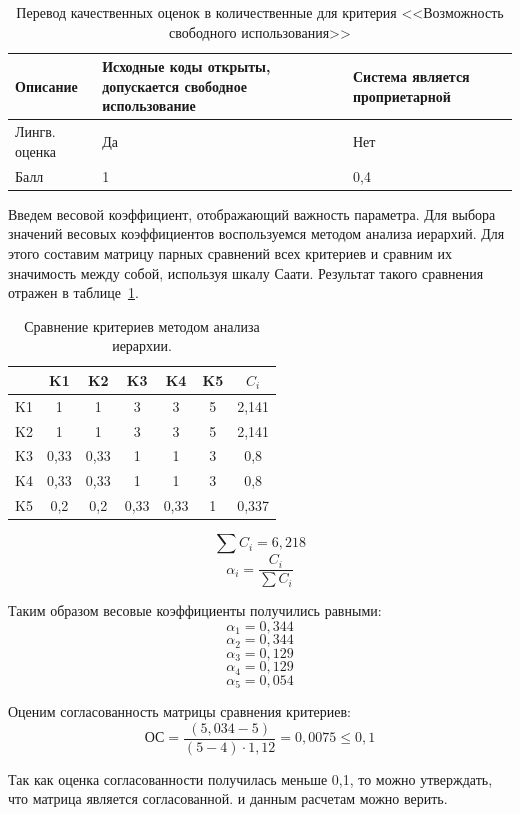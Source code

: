 \begin{table}[!htb]
	\caption{Перевод качественных оценок в количественные для критерия 
  <<Возможность свободного использования>>}
    \centering
	\begin{tabular}{|p{3cm}|p{6cm}|p{6cm}|}
	\hline 
	Описание & 
	Исходные коды открыты, допускается свободное использование & 
	Система является проприетарной \\ 
	\hline 
	Лингв. оценка & Да & Нет \\ 
	\hline 
	Балл & 1 & 0,4 \\ 
	\hline 
	\end{tabular} 
\end{table} 

Введем весовой коэффициент, отображающий важность параметра. Для выбора значений весовых коэффициентов воспользуемся методом анализа иерархий. Для этого составим матрицу парных сравнений всех критериев и сравним их значимость между собой, используя шкалу Саати. Результат такого сравнения отражен в таблице~\ref{table:criterii}.

\begin{table}[H]
	\caption{Сравнение критериев методом анализа иерархии.}\label{table:criterii}
    \centering
\begin{tabular}{|c|c|c|c|c|c|c|}
\hline 
~ & K1 & K2 & K3 & K4 & K5 & $C_i$ \\ 
\hline 
K1 & 1 & 1 & 3 & 3 & 5 & 2,141 \\ 
\hline 
K2 & 1 & 1 & 3 & 3 & 5 & 2,141 \\ 
\hline 
K3 & 0,33 & 0,33 & 1 & 1 & 3 & 0,8 \\ 
\hline 
K4 & 0,33 & 0,33 & 1 & 1 & 3 & 0,8 \\ 
\hline 
K5 & 0,2 & 0,2 & 0,33 & 0,33 & 1 & 0,337 \\ 
\hline 
\end{tabular} 
    		
\end{table}

$$ \sum{C_i} = 6,218 $$
$$ \alpha_i = \frac{C_i}{\sum{C_i}} $$

Таким образом весовые коэффициенты получились равными:
$$\alpha_1 = 0,344 $$
$$\alpha_2 = 0,344 $$
$$\alpha_3 = 0,129 $$
$$\alpha_4 = 0,129 $$
$$\alpha_5 = 0,054 $$

Оценим согласованность матрицы сравнения критериев:
$$ ОС = \frac{(5,034 - 5)}{(5-4) \cdot 1,12 }= 0,0075 \leq 0,1$$

Так как оценка согласованности получилась меньше 0,1, то можно утверждать, что матрица является согласованной. и данным расчетам можно верить. 


